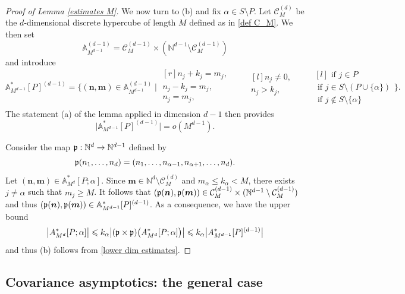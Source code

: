 \documentclass[a4paper,11pt]{article}
\numberwithin{equation}{section}
\theoremstyle{definition}
\newcommand{\eq}{\begin{equation}}
\newcommand{\qe}{\end{equation}}
\newcommand{\N}{\mathbb{N}}
\newcommand{\bs}{\boldsymbol}
\renewcommand{\leq}{\leqslant}
\renewcommand{\geq}{\geqslant}
\begin{document}
\begin{proof}[Proof of Lemma \ref{estimates M}]
We now turn to (b) and fix $\alpha\in S\setminus P$. Let $\mathcal C_M^{(d)}$ be  the $d$-dimensional discrete hypercube of length $M$ defined as in \eqref{def C_M}. We then set
\[
\mathbb A^{(d-1)}_{M^{d-1}}=\mathcal C_M^{(d-1)}\times (\N^{d-1}\setminus\mathcal C_M^{(d-1)})
\]
and introduce
\[
\mathbb A_{M^{d-1}}^*[P]^{(d-1)}=
\Bigg\{(\bs n,\bs m)\in\mathbb A^{(d-1)}_{M^{d-1}} \;\Bigg| \;
\begin{matrix*}[r]
n_j+k_j=m_j, \\
n_j-k_j=m_j, \\
n_j=m_j,\\
\end{matrix*}
\qquad
\begin{matrix*}[l]
n_j\neq 0, \\
n_j > k_j, \\
\\
\end{matrix*}
\qquad
\begin{matrix*}[l]
\mbox{ if } j\in P\\
\mbox{ if } j\in S\setminus (P\cup\{\alpha\})\\
\mbox{ if } j\notin S\setminus\{\alpha\}
\end{matrix*}
\Bigg\}.
\]
The statement (a) of the  lemma applied in dimension $d-1$ then provides
\eq
\label{lower dim estimates}
\big| \mathbb A_{M^{d-1}}^*[P]^{(d-1)}\big| = o(M^{d-1}).
\qe

Consider  the map $\frak p:\N^d\to\N^{d-1}$ defined by
\[
\frak p(n_1,\ldots,n_d)=(n_1,\ldots, n_{\alpha-1},n_{\alpha+1},\ldots,n_d).
\]
Let $(\bs n,\bs m)\in  \mathbb A_{M^d}^*[P;\alpha]$.  Since $\bs m\in\N^d\setminus \mathcal C_M^{(d)}$ and $m_\alpha\leq k_\alpha<M$, there exists $j\neq \alpha$ such that $m_j\geq M$.  It follows that  $(\frak p(\bs n),\frak p(\bs m))\in \mathcal C_M^{(d-1)}\times (\N^{d-1}\setminus \mathcal C_M^{(d-1)})$ and thus $(\frak p(\bs n),\frak p(\bs m))\in \mathbb A^{*}_{M^{d-1}}[P]^{(d-1)}$. As a consequence, we have the upper bound
\[
\big| A_{M^d}^*[P;\alpha]\big|\leq k_\alpha \big| (\frak p\times \frak p)\big(A_{M^d}^*[P;\alpha]\big)\big|\leq k_\alpha \big| A_{M^{d-1}}^*[P]^{(d-1)}\big|
\]
and thus (b) follows from \eqref{lower dim estimates}.


\end{proof}


\subsection{Covariance asymptotics: the general case}
\end{document}
